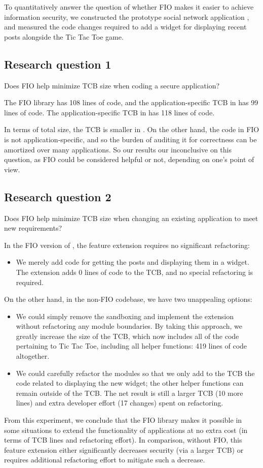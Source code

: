 \begin{refsection}
To quantitatively answer the question of whether FIO makes it easier to achieve information security,
we constructed the prototype social network application \myapp{},
and measured the code changes required to add a widget for displaying recent posts alongside the Tic Tac Toe game.

\subsection{Research question 1}

Does FIO help minimize TCB size when coding a secure application?

The FIO library has 108 lines of code,
and the application-specific TCB in \viF{} has 99 lines of code.
%
The application-specific TCB in \viN{} has 118 lines of code.

In terms of total size,
the TCB is smaller in \viN{}.
%
On the other hand,
the code in FIO is not application-specific,
and so the burden of auditing it for correctness can be amortized over many applications.
%
So our results our inconclusive on this question,
as FIO could be considered helpful or not,
depending on one's point of view.

\subsection{Research question 2}
Does FIO help minimize TCB size when changing an existing application to meet new requirements?

In the FIO version of \myapp{}, the feature extension requires no significant refactoring:
\begin{itemize}
  \item
    We merely add code for getting the posts and displaying them in a widget.
    The extension adds 0 lines of code to the TCB,
    and no special refactoring is required.
\end{itemize}
On the other hand, in the non-FIO codebase,
we have two unappealing options:
\begin{itemize}
  \item
    We could simply remove the sandboxing and implement the extension without refactoring any module boundaries.
    By taking this approach, we greatly increase the size of the TCB,
    which now includes all of the code pertaining to Tic Tac Toe,
    including all helper functions:
    419 lines of code altogether.
  \item
    We could carefully refactor the modules so that we only add to the TCB the code related to displaying the new widget;
    the other helper functions can remain outside of the TCB.
    The net result is still a larger TCB (10 more lines) and extra developer effort (17 changes) spent on refactoring.
\end{itemize}
From this experiment,
we conclude that the FIO library makes it possible in some situations to extend the functionality of applications at no extra cost
(in terms of TCB lines and refactoring effort).
%
In comparison, without FIO,
this feature extension either significantly decreases security (via a larger TCB)
or requires additional refactoring effort to mitigate such a decrease.


\end{refsection}
